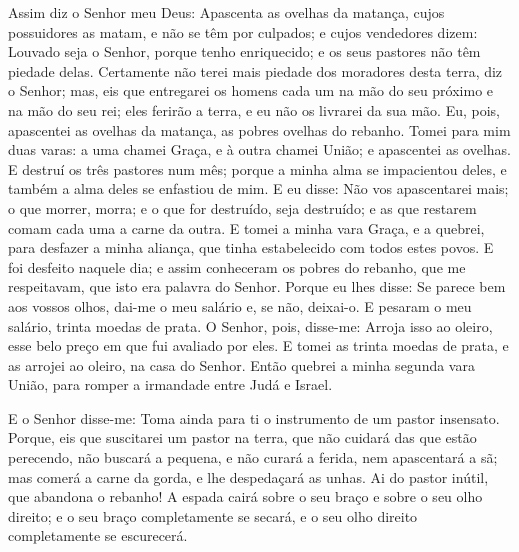 Assim diz o Senhor meu Deus: Apascenta as ovelhas da matança,
cujos possuidores as matam, e não se têm por culpados; e cujos
vendedores dizem: Louvado seja o Senhor, porque tenho enriquecido; e
os seus pastores não têm piedade delas. Certamente não terei
mais piedade dos moradores desta terra, diz o Senhor; mas, eis que
entregarei os homens cada um na mão do seu próximo e na mão do seu
rei; eles ferirão a terra, e eu não os livrarei da sua mão. Eu,
pois, apascentei as ovelhas da matança, as pobres ovelhas do
rebanho. Tomei para mim duas varas: a uma chamei Graça, e à outra
chamei União; e apascentei as ovelhas. E destruí os três
pastores num mês; porque a minha alma se impacientou deles, e também
a alma deles se enfastiou de mim. E eu disse: Não vos
apascentarei mais; o que morrer, morra; e o que for destruído, seja
destruído; e as que restarem comam cada uma a carne da outra.
E tomei a minha vara Graça, e a quebrei, para desfazer a
minha aliança, que tinha estabelecido com todos estes povos.
E foi desfeito naquele dia; e assim conheceram os pobres do
rebanho, que me respeitavam, que isto era palavra do Senhor.
Porque eu lhes disse: Se parece bem aos vossos olhos, dai-me
o meu salário e, se não, deixai-o. E pesaram o meu salário, trinta
moedas de prata. O Senhor, pois, disse-me: Arroja isso ao
oleiro, esse belo preço em que fui avaliado por eles. E tomei as
trinta moedas de prata, e as arrojei ao oleiro, na casa do Senhor.
Então quebrei a minha segunda vara União, para romper a
irmandade entre Judá e Israel.

E o Senhor disse-me: Toma ainda para ti o instrumento de um
pastor insensato. Porque, eis que suscitarei um pastor na
terra, que não cuidará das que estão perecendo, não buscará a
pequena, e não curará a ferida, nem apascentará a sã; mas comerá a
carne da gorda, e lhe despedaçará as unhas. Ai do pastor
inútil, que abandona o rebanho! A espada cairá sobre o seu braço e
sobre o seu olho direito; e o seu braço completamente se secará, e o
seu olho direito completamente se escurecerá.

\medskip

